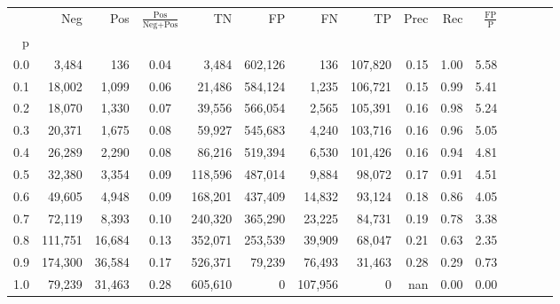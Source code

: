 \begin{tabular}{rrrcrrrrrrrrrrr}
\toprule
{} &      Neg &     Pos & $\frac{\text{Pos}}{\text{Neg}+\text{Pos}}$ &       TN &       FP &       FN &       TP &  Prec &   Rec & $\frac{\text{FP}}{\text{P}}$ \\
p   &          &         &                                            &          &          &          &          &       &       &                              \\
\midrule
0.0 &    3,484 &     136 &                                       0.04 &    3,484 &  602,126 &      136 &  107,820 &  0.15 &  1.00 &                         5.58 \\
0.1 &   18,002 &   1,099 &                                       0.06 &   21,486 &  584,124 &    1,235 &  106,721 &  0.15 &  0.99 &                         5.41 \\
0.2 &   18,070 &   1,330 &                                       0.07 &   39,556 &  566,054 &    2,565 &  105,391 &  0.16 &  0.98 &                         5.24 \\
0.3 &   20,371 &   1,675 &                                       0.08 &   59,927 &  545,683 &    4,240 &  103,716 &  0.16 &  0.96 &                         5.05 \\
0.4 &   26,289 &   2,290 &                                       0.08 &   86,216 &  519,394 &    6,530 &  101,426 &  0.16 &  0.94 &                         4.81 \\
0.5 &   32,380 &   3,354 &                                       0.09 &  118,596 &  487,014 &    9,884 &   98,072 &  0.17 &  0.91 &                         4.51 \\
0.6 &   49,605 &   4,948 &                                       0.09 &  168,201 &  437,409 &   14,832 &   93,124 &  0.18 &  0.86 &                         4.05 \\
0.7 &   72,119 &   8,393 &                                       0.10 &  240,320 &  365,290 &   23,225 &   84,731 &  0.19 &  0.78 &                         3.38 \\
0.8 &  111,751 &  16,684 &                                       0.13 &  352,071 &  253,539 &   39,909 &   68,047 &  0.21 &  0.63 &                         2.35 \\
0.9 &  174,300 &  36,584 &                                       0.17 &  526,371 &   79,239 &   76,493 &   31,463 &  0.28 &  0.29 &                         0.73 \\
1.0 &   79,239 &  31,463 &                                       0.28 &  605,610 &        0 &  107,956 &        0 &   nan &  0.00 &                         0.00 \\
\bottomrule
\end{tabular}

